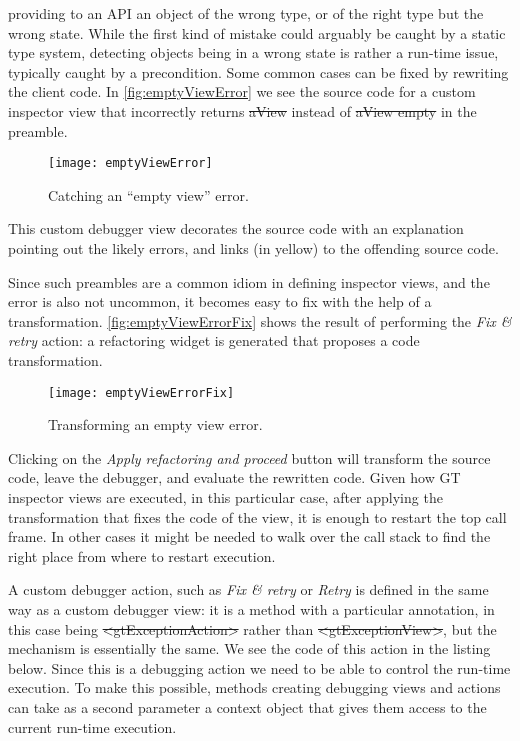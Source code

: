 \documentclass[sigplan,screen]{acmart} %
\newcommand\on[1]{\nbc{ON}{#1}{olive}} %
\newcommand\ac[1]{\nbc{AC}{#1}{teal}}
\newcommand{\GT}{\lst{GT}\xspace} %
\begin{document}
providing to an API an object of the wrong type, or of the right type but the wrong state.
While the first kind of mistake could arguably be caught by a static type system, detecting objects being in a wrong state is rather a run-time issue, typically caught by a precondition.
Some common cases can be fixed by rewriting the client code.
In \autoref{fig:emptyViewError} we see the source code for a custom inspector view that incorrectly returns \st{aView} instead of \st{aView empty} in the preamble.
\begin{figure}[h]
  \texttt{[image: emptyViewError]}
  \caption{Catching an ``empty view'' error.}
  \label{fig:emptyViewError}
\end{figure}
This custom debugger view decorates the source code with an explanation pointing out the likely errors, and links (in yellow) to the offending source code.

Since such preambles are a common idiom in defining \GT inspector views, and the error is also not uncommon, it becomes easy to fix with the help of a transformation.
\autoref{fig:emptyViewErrorFix} shows the result of performing the \emph{Fix \& retry} action: a refactoring widget is generated that proposes a code transformation.
\begin{figure*}[h]
  \texttt{[image: emptyViewErrorFix]}
  \caption{Transforming an empty view error.}
  \label{fig:emptyViewErrorFix}
\end{figure*}
Clicking on the \emph{Apply refactoring and proceed} button will transform the source code, leave the debugger, and evaluate the rewritten code.
Given how GT inspector views are executed, in this particular case, after applying the transformation that fixes the code of the view, it is enough to restart the top call frame.
In other cases it might be needed to walk over the call stack to find the right place from where to restart execution.

A custom debugger action, such as \emph{Fix \& retry} or \emph{Retry} is defined in the same way as a custom debugger view: it is a method with a particular annotation, in this case being \mbox{\st{<gtExceptionAction>}} rather than \mbox{\st{<gtExceptionView>}}, but  the mechanism is essentially the same. We see the code of this action in the listing below.
Since this is a debugging action we need to be able to control the run-time execution.
To make this possible, methods creating debugging views and actions can take as a second parameter a context object that gives them access to the current run-time execution.
\end{document}
